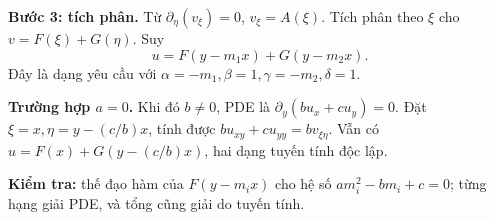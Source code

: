\documentclass[10pt,a4paper]{article}
\begin{document}
\textbf{Bước 3: tích phân.} Từ $\partial_\eta(v_\xi)=0$, $v_\xi=A(\xi)$. Tích phân theo $\xi$ cho $v=F(\xi)+G(\eta)$. Suy
\[\boxed{u=F(y-m_1x)+G(y-m_2x).}\]
Đây là dạng yêu cầu với $\alpha=-m_1,\beta=1,\gamma=-m_2,\delta=1$.

\textbf{Trường hợp $a=0$.} Khi đó $b\ne0$, PDE là $\partial_y(bu_x+cu_y)=0$. Đặt $\xi=x,\eta=y-(c/b)x$, tính được $bu_{xy}+cu_{yy}=b v_{\xi\eta}$. Vẫn có $u=F(x)+G(y-(c/b)x)$, hai dạng tuyến tính độc lập.

\textbf{Kiểm tra:} thế đạo hàm của $F(y-m_ix)$ cho hệ số $am_i^2-bm_i+c=0$; từng hạng giải PDE, và tổng cũng giải do tuyến tính.
\end{document}
